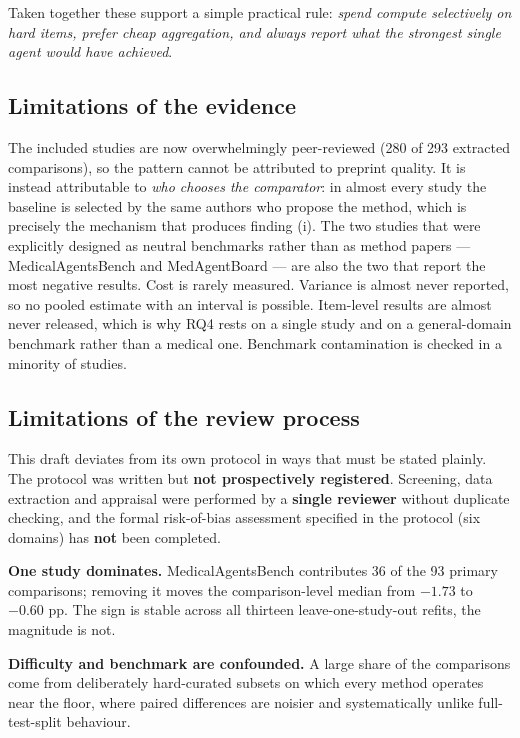 \documentclass[11pt,a4paper]{article}
\begin{document}
Taken together these support a simple practical rule: \emph{spend compute selectively on
hard items, prefer cheap aggregation, and always report what the strongest single agent
would have achieved}.

\subsection{Limitations of the evidence}
The included studies are now overwhelmingly peer-reviewed (280 of 293 extracted comparisons),
so the pattern cannot be attributed to preprint quality. It is instead attributable to
\emph{who chooses the comparator}: in almost every study the baseline is selected by the same
authors who propose the method, which is precisely the mechanism that produces finding (i).
The two studies that were explicitly designed as neutral benchmarks rather than as method
papers --- MedicalAgentsBench and MedAgentBoard --- are also the two that report the most
negative results. Cost is rarely measured. Variance is almost never
reported, so no pooled estimate with an interval is possible. Item-level results are
almost never released, which is why RQ4 rests on a single study and on a general-domain
benchmark rather than a medical one. Benchmark contamination is checked in a minority of
studies.

\subsection{Limitations of the review process}
\label{sec:limproc}
This draft deviates from its own protocol in ways that must be stated plainly.
The protocol was written but \textbf{not prospectively registered}. Screening, data
extraction and appraisal were performed by a \textbf{single reviewer} without duplicate
checking, and the formal risk-of-bias assessment specified in the protocol (six domains) has
\textbf{not} been completed.

\textbf{One study dominates.} MedicalAgentsBench contributes 36 of the 93 primary
comparisons; removing it moves the comparison-level median from $-1.73$ to $-0.60$ pp. The
sign is stable across all thirteen leave-one-study-out refits, the magnitude is not.

\textbf{Difficulty and benchmark are confounded.} A large share of the comparisons come from
deliberately hard-curated subsets on which every method operates near the floor, where paired
differences are noisier and systematically unlike full-test-split behaviour.
\end{document}
